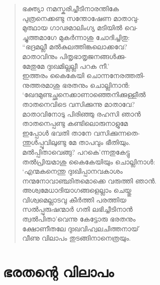 \begin{verse}
ഭക്ത്യാ നമസ്കരിച്ചീടിനാരന്തികേ\\
പുത്രനെക്കണ്ടു സന്തോഷേണ മാതാവു-\\
മുത്ഥായ ഗാഢമാലിംഗ്യ മടിയില്‍ വെ-\\
ച്ചുത്തമാഗേ മുകര്‍ന്നാശു ചോദിച്ചിതു:\\
“ഭദ്രമല്ലീ മല്‍കുലത്തിങ്കലൊക്കവേ?\\
മാതാവിനും പിതൃഭാതൃജനങ്ങള്‍ക്കു-\\
മേതുമേ ദുഃഖമില്ലല്ലീ പറക നീ.’\\
ഇത്തരം കൈകേയി ചൊന്നനേരത്തതി-\\
നുത്തരമാശു ഭരതനും ചൊല്ലിനാന്‍:\\
‘ഖേദമുണ്ടച്ഛനെക്കാണാഞ്ഞെനിക്കുള്ളീല്‍\\
താതനെവിടെ വസിക്കുന്നു മാതാവേ?\\
മാതാവിനോടു പിരിഞ്ഞു രഹസി ഞാന്‍\\
താതനെപ്പണ്ടു കണ്ടിലൊരുനാളുമേ\\
ഇപ്പോള്‍ ഭവതി താനേ വസിക്കുന്നതെ-\\
ന്തുള്‍പ്പൂവിലുണ്ടു മേ താപവും ഭീതിയും.\\
മല്‍പ്പിതാവെങ്ങു? പറകെ’ന്നതുകേട്ടു\\
തല്‍പ്രിയമാശു കൈകേയിയും ചൊല്ലിനാള്‍:\\
‘എന്മകനെന്തു ദുഃഖിപ്പാനവകാശം\\
നന്മനോവാഞ്ഛിതമൊക്കെ വരുത്തി ഞാന്‍.\\
അശ്വമേധാദിയാഗങ്ങളെല്ലാം ചെയ്തു\\
വിശ്വമെല്ലാടവു കീര്‍ത്തി പരത്തിയ\\
സല്‍പ്പുരുഷന്മാര്‍ ഗതി ലഭിച്ചീടിനാന്‍\\
ത്വല്‍പിതാ’വെന്നു കേട്ടോരു ഭരതനും\\
ക്ഷോണീതലേ ദുഃഖവിഹ്വലചിത്തനായ്\\
വീണു വിലാപം തുടങ്ങിനാനെത്രയും.
\end{verse}


\section{ഭരതന്റെ വിലാപം}

